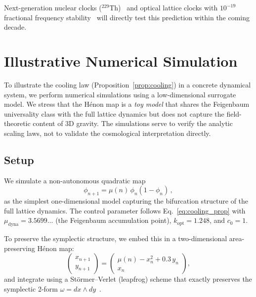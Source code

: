 \documentclass[twocolumn,showpacs,preprintnumbers,amsmath,amssymb,prd]{revtex4-2}
\begin{document}
Next-generation nuclear clocks ($^{229}$Th)~\cite{Peik2021}
and optical lattice clocks with $10^{-19}$ fractional frequency
stability~\cite{Bothwell2022} will directly test this prediction
within the coming decade.

\section{Illustrative Numerical Simulation}\label{sec:simulation}

To illustrate the cooling law (Proposition~\ref{prop:cooling})
in a concrete dynamical system, we perform numerical simulations
using a low-dimensional surrogate model.
We stress that the H\'enon map is a \emph{toy model} that shares
the Feigenbaum universality class with the full lattice dynamics
but does not capture the field-theoretic content of 3D gravity.
The simulations serve to verify the analytic scaling laws,
not to validate the cosmological interpretation directly.

\subsection{Setup}
\label{sec:sim_setup}

We simulate a non-autonomous quadratic map
\begin{equation}
  \phi_{n+1} = \mu(n)\,\phi_n(1-\phi_n)\,,
  \label{eq:logistic}
\end{equation}
as the simplest one-dimensional model capturing the bifurcation
structure of the full lattice dynamics.
The control parameter follows Eq.~\eqref{eq:cooling_prop} with
$\mu_{\mathrm{dyna}} = 3.5699\ldots$ (the Feigenbaum accumulation
point), $k_{\mathrm{opt}} = 1.248$, and $c_0 = 1$.

To preserve the symplectic structure, we embed this in a
two-dimensional area-preserving H\'enon map:
\begin{equation}
  \begin{pmatrix} x_{n+1} \\ y_{n+1} \end{pmatrix}
  = \begin{pmatrix} \mu(n) - x_n^2 + 0.3\,y_n \\ x_n \end{pmatrix},
  \label{eq:henon}
\end{equation}
and integrate using a St\"ormer--Verlet (leapfrog) scheme that
exactly preserves the symplectic 2-form
$\omega = dx \wedge dy$~\cite{HairerLubichWanner2006}.
\end{document}
